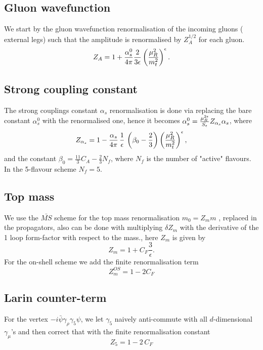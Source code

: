 \subsection{Gluon wavefunction}
We start by the gluon wavefunction renormalisation of the incoming gluons  ( external legs) such that the amplitude is renormalised by $ Z_A^{1/2}$ for each gluon.
\begin{equation}
	Z_A= 1+\frac{\alpha_s^0}{4 \pi} \frac{2}{3\epsilon} \left( \frac{\mu_R^2}{m_t^2} \right) ^\epsilon.
\end{equation}
\subsection{ Strong coupling constant}

The strong couplings constant $ \alpha_s$ renormalisation is done via replacing the bare constant $\alpha_s^0$ with the renormalised one, hence it becomes  $ \alpha^0_s = \frac{\mu_R^{2\epsilon}}{S_\epsilon}  Z_{\alpha_s} \alpha_s$, where
\begin{equation}
	Z_{\alpha_s} = 1- \frac{\alpha_s}{4 \pi} \, \frac{1}{ \epsilon}\,  \left( \beta_0-\frac{2}{3} \right) \left(\frac{\mu_R^2}{m_t^2} \right) ^\epsilon,
\end{equation}
and the constant $ \beta_0 = \frac{11}{3} C_A -\frac{2}{3}N_f$, where $N_f$ is the number of "active" flavours. In the 5-flavour scheme $N_f=5$.
\subsection{ Top mass}
We use the $\bar{MS}$ scheme for the top mass renormalisation $ m_0 = Z_m m$ , replaced in the propagators, also can be done with multiplying $ \delta Z_m$ with the derivative of the 1 loop form-factor with respect to the  mass., here $Z_m$ is given by
\begin{equation}
	Z_m = 1+ C_F \frac{3}{\epsilon}.
\end{equation}
For the on-shell scheme we add the finite renormalisation term
\begin{equation}
	Z^{OS}_m = 1- 2 C_F
\end{equation}
\subsection{ Larin counter-term}
For the vertex $ -i \bar \psi \gamma_\rho \gamma_5 \psi$, we let $\gamma_5$ naively anti-commute with all $d$-dimensional $\gamma_\mu$'s and then correct that with the finite renormalisation constant
\begin{equation}
	Z_5 = 1- 2\, C_F
\end{equation}

